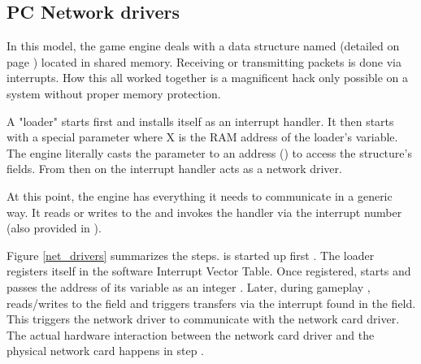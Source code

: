 




\subsection{PC Network drivers}
In this model, the game engine deals with a data structure named  (detailed on page \pageref{doomcom_t.c}) located in shared memory. Receiving or transmitting packets is done via interrupts. How this all worked together is a magnificent hack only possible on a system without proper memory protection.\\
\par
A "loader" starts first and installs itself as an interrupt handler. It then starts  with a special parameter  where X is the RAM address of the loader's  variable. The engine literally casts the parameter to an address () to access the structure's fields. From then on the interrupt handler acts as a network driver.\\
\par

\par
 At this point, the engine has everything it needs to communicate in a generic way. It reads or writes to the  and invokes the handler via the interrupt number (also provided in ).\\
\par
{}
\par
\vspace{-10pt}
 Figure \ref{net_drivers} summarizes the steps.  is started up first . The loader registers itself in the software Interrupt Vector Table. Once registered,  starts  and passes the address of its  variable as an integer . Later, during gameplay ,  reads/writes to the   field and triggers transfers via the interrupt found in the  field. This triggers  the \doom{} network driver to communicate with the network card driver. The actual hardware interaction between the network card driver and the physical network card happens in step .




